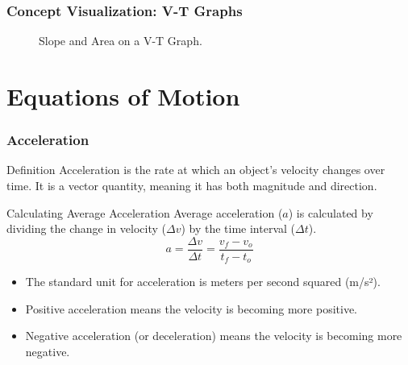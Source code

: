 \documentclass{beamer}
\begin{document}
\begin{frame}[allowframebreaks]
\frametitle{Concept Visualization: V-T Graphs}
\begin{figure}
\centering
{}
\caption{Slope and Area on a V-T Graph.}
\end{figure}
\end{frame}

\section{Equations of Motion}

\begin{frame}[allowframebreaks]
\frametitle{Acceleration}
\begin{block}{Definition}
Acceleration is the rate at which an object's velocity changes over time. It is a vector quantity, meaning it has both magnitude and direction.
\end{block}

\begin{block}{Calculating Average Acceleration}
Average acceleration ($a$) is calculated by dividing the change in velocity ($\Delta v$) by the time interval ($\Delta t$).
\begin{equation*}
a = \frac{\Delta v}{\Delta t} = \frac{v_f - v_o}{t_f - t_o}
\end{equation*}
\begin{itemize}
    \item The standard unit for acceleration is \alert{meters per second squared (m/s²)}.
    \item \alert{Positive acceleration} means the velocity is becoming more positive.
    \item \alert{Negative acceleration} (or deceleration) means the velocity is becoming more negative.
\end{itemize}
\end{block}
\end{frame}
\end{document}
